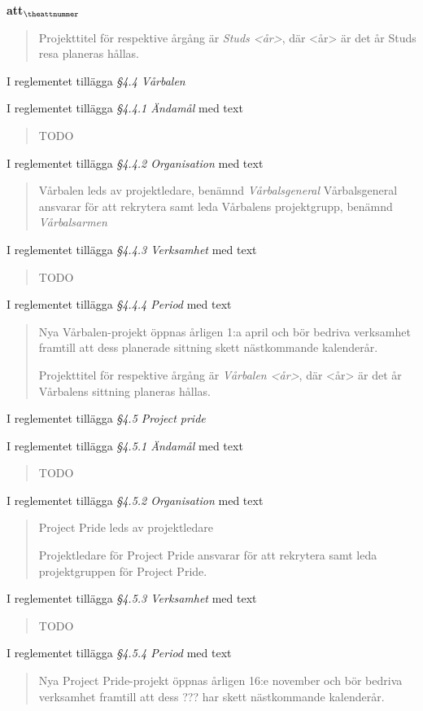 \documentclass[a4paper]{article}
\begin{document}
\begin{list}{\bf att$_{\theattnummer}$}{}
\begin{quote}
        Projekttitel för respektive årgång är \textit{Studs <år>}, där <år> är det år Studs resa planeras hållas.
    \end{quote}


\item I reglementet tillägga \textit{\S4.4 Vårbalen}
\item I reglementet tillägga \textit{\S4.4.1 Ändamål} med text
    \begin{quote}
        TODO
    \end{quote}
\item I reglementet tillägga \textit{\S4.4.2 Organisation} med text
    \begin{quote} Vårbalen leds av projektledare, benämnd \textit{Vårbalsgeneral}
        Vårbalsgeneral ansvarar för att rekrytera samt leda Vårbalens projektgrupp, benämnd \textit{Vårbalsarmen}
    \end{quote}
\item I reglementet tillägga \textit{\S4.4.3 Verksamhet} med text
    \begin{quote}
        TODO
    \end{quote}
\item I reglementet tillägga \textit{\S4.4.4 Period} med text
    \begin{quote}
        Nya Vårbalen-projekt öppnas årligen 1:a april och bör bedriva verksamhet framtill att dess planerade sittning skett nästkommande kalenderår.
        
        Projekttitel för respektive årgång är \textit{Vårbalen <år>}, där <år> är det år Vårbalens sittning planeras hållas.
    \end{quote}


\item I reglementet tillägga \textit{\S4.5 Project pride}
\item I reglementet tillägga \textit{\S4.5.1 Ändamål} med text
    \begin{quote}
        TODO
    \end{quote}
\item I reglementet tillägga \textit{\S4.5.2 Organisation} med text
    \begin{quote}
        Project Pride leds av projektledare

        Projektledare för Project Pride ansvarar för att rekrytera samt leda projektgruppen för Project Pride.
    \end{quote}
\item I reglementet tillägga \textit{\S4.5.3 Verksamhet} med text
    \begin{quote}
        TODO
    \end{quote}
\item I reglementet tillägga \textit{\S4.5.4 Period} med text
    \begin{quote}
        Nya Project Pride-projekt öppnas årligen 16:e november och bör bedriva verksamhet framtill att dess ??? har skett nästkommande kalenderår.


\end{quote}
\end{list}
\end{document}
